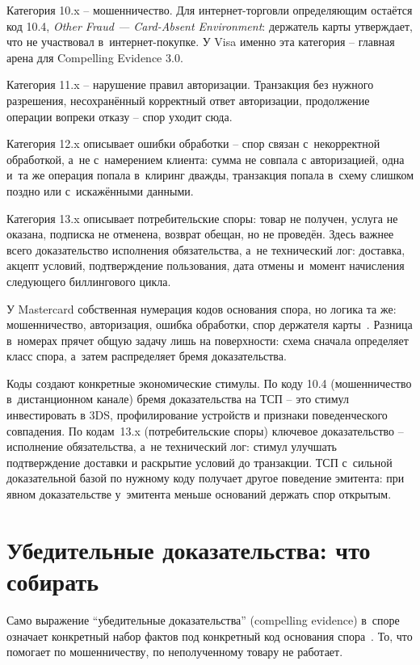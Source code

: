 Категория 10.x -- мошенничество. Для интернет-торговли определяющим остаётся
код 10.4, \textit{Other Fraud --- Card-Absent Environment}:
держатель карты утверждает, что не участвовал в~интернет-покупке.
У Visa именно эта категория -- главная арена для
Compelling Evidence 3.0.

Категория 11.x -- нарушение правил авторизации.
Транзакция без нужного разрешения, несохранённый корректный ответ
авторизации, продолжение операции вопреки отказу -- спор уходит сюда.

Категория 12.x описывает ошибки обработки -- спор связан
с~некорректной обработкой, а~не с~намерением клиента: сумма не совпала с
авторизацией, одна и~та же операция попала в~клиринг дважды, транзакция
попала в~схему слишком поздно или с~искажёнными данными.

Категория 13.x описывает потребительские споры: товар не получен, услуга
не оказана, подписка не отменена, возврат обещан, но не проведён.
Здесь важнее всего доказательство исполнения обязательства,
а~не технический лог: доставка, акцепт условий, подтверждение пользования,
дата отмены и~момент начисления следующего биллингового цикла.

У Mastercard собственная нумерация кодов основания спора, но логика
та же: мошенничество, авторизация, ошибка обработки, спор держателя
карты~\cite{mc-chargeback-guide}. Разница в~номерах прячет общую
задачу лишь на поверхности: схема сначала определяет класс спора, а~затем
распределяет бремя доказательства.

Коды создают конкретные экономические стимулы. По коду 10.4
(мошенничество в~дистанционном канале) бремя доказательства на
ТСП -- это стимул инвестировать в 3DS, профилирование устройств
и признаки поведенческого совпадения. По кодам~13.x (потребительские
споры) ключевое доказательство -- исполнение обязательства, а~не
технический лог: стимул улучшать подтверждение доставки
и раскрытие условий до транзакции. ТСП с~сильной доказательной
базой по нужному коду получает другое поведение эмитента: при явном
доказательстве у~эмитента меньше оснований держать спор открытым.

\section{Убедительные доказательства: что собирать}\label{sec:disputes-evidence}

Само выражение \enquote{убедительные доказательства} (compelling evidence)
в~споре означает конкретный набор
фактов под конкретный код основания спора~\cite{visa-core-rules}.
То, что помогает по мошенничеству, по неполученному товару не работает.

